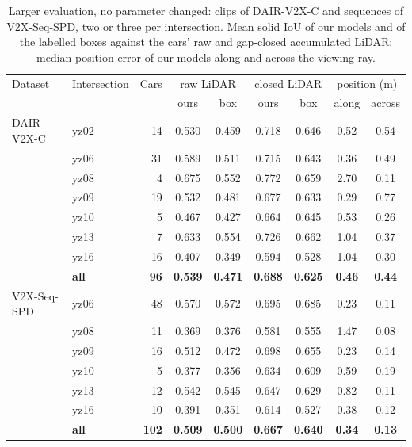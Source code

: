 \begin{table}[!htb]
\centering
\caption{Larger evaluation, no parameter changed: clips of DAIR-V2X-C and sequences of V2X-Seq-SPD, two or three per intersection. Mean solid IoU of our models and of the labelled boxes against the cars' raw and gap-closed accumulated LiDAR; median position error of our models along and across the viewing ray.}
\label{tab:large}
\footnotesize
\begin{tabular}{llrcccccc}
\toprule
Dataset & Intersection & Cars & \multicolumn{2}{c}{raw LiDAR} & \multicolumn{2}{c}{closed LiDAR} & \multicolumn{2}{c}{position (m)} \\
\cmidrule(lr){4-5}\cmidrule(lr){6-7}\cmidrule(lr){8-9}
 & & & ours & box & ours & box & along & across \\
\midrule
DAIR-V2X-C & yz02 & 14 & 0.530 & 0.459 & 0.718 & 0.646 & 0.52 & 0.54 \\
 & yz06 & 31 & 0.589 & 0.511 & 0.715 & 0.643 & 0.36 & 0.49 \\
 & yz08 & 4 & 0.675 & 0.552 & 0.772 & 0.659 & 2.70 & 0.11 \\
 & yz09 & 19 & 0.532 & 0.481 & 0.677 & 0.633 & 0.29 & 0.77 \\
 & yz10 & 5 & 0.467 & 0.427 & 0.664 & 0.645 & 0.53 & 0.26 \\
 & yz13 & 7 & 0.633 & 0.554 & 0.726 & 0.662 & 1.04 & 0.37 \\
 & yz16 & 16 & 0.407 & 0.349 & 0.594 & 0.528 & 1.04 & 0.30 \\
 & \textbf{all} & \textbf{96} & \textbf{0.539} & \textbf{0.471} & \textbf{0.688} & \textbf{0.625} & \textbf{0.46} & \textbf{0.44} \\
\midrule
V2X-Seq-SPD & yz06 & 48 & 0.570 & 0.572 & 0.695 & 0.685 & 0.23 & 0.11 \\
 & yz08 & 11 & 0.369 & 0.376 & 0.581 & 0.555 & 1.47 & 0.08 \\
 & yz09 & 16 & 0.512 & 0.472 & 0.698 & 0.655 & 0.23 & 0.14 \\
 & yz10 & 5 & 0.377 & 0.356 & 0.634 & 0.609 & 0.59 & 0.19 \\
 & yz13 & 12 & 0.542 & 0.545 & 0.647 & 0.629 & 0.82 & 0.11 \\
 & yz16 & 10 & 0.391 & 0.351 & 0.614 & 0.527 & 0.38 & 0.12 \\
 & \textbf{all} & \textbf{102} & \textbf{0.509} & \textbf{0.500} & \textbf{0.667} & \textbf{0.640} & \textbf{0.34} & \textbf{0.13} \\
\bottomrule
\end{tabular}
\end{table}
